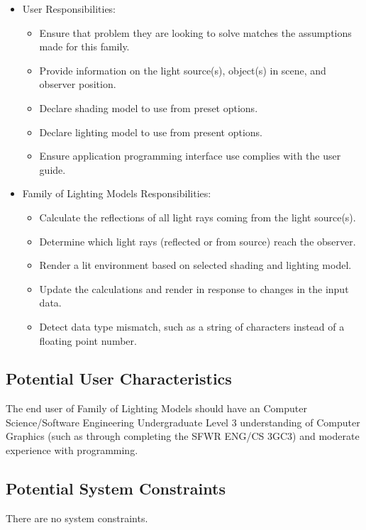 \documentclass[12pt]{article}
\newcommand{\famname}{Family of Lighting Models} %
\begin{document}
\begin{itemize}
\item User Responsibilities:
\begin{itemize}
\item Ensure that problem they are looking to solve matches the assumptions 
made for this family.
\item Provide information on the light source(s), object(s) in scene, and 
observer position.
\item Declare shading model to use from preset options.
\item Declare lighting model to use from present options.
\item Ensure application programming interface use complies with the user guide.
\end{itemize}
\item \famname{} Responsibilities:
\begin{itemize}
\item Calculate the reflections of all light rays coming from the light 
source(s).
\item Determine which light rays (reflected or from source) reach the observer.
\item Render a lit environment based on selected shading and lighting model.
\item Update the calculations and render in response to changes in the input 
data.
\item Detect data type mismatch, such as a string of characters instead of a
  floating point number.
\end{itemize}
\end{itemize}

\subsection{Potential User Characteristics} \label{SecUserCharacteristics}

The end user of \famname{} should have an Computer Science/Software Engineering 
Undergraduate Level 3 understanding of Computer Graphics (such as through 
completing the SFWR ENG/CS 3GC3) and moderate experience with programming.

\subsection{Potential System Constraints}
There are no system constraints.

%
%
\end{document}
